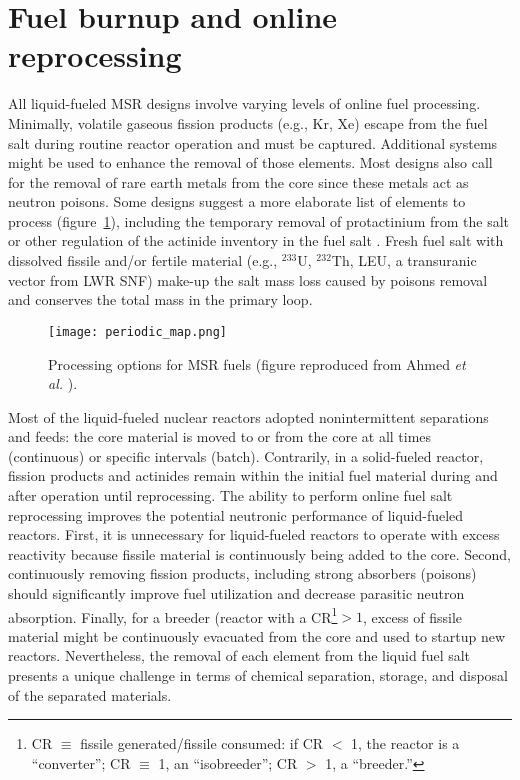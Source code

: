 \section{Fuel burnup and online reprocessing}
All liquid-fueled \gls{MSR} designs involve varying levels of online fuel 
processing. Minimally, volatile gaseous fission products (e.g., Kr, Xe) 
escape from the fuel salt during routine reactor operation and must be 
captured. Additional systems might be used to enhance the removal of those 
elements. Most designs also call for the removal of rare earth metals from 
the core since these metals act as neutron poisons. Some designs suggest a 
more elaborate list of elements to process (figure~\ref{fig:periodic_tab}), 
including the temporary removal of protactinium from the salt or other 
regulation of the actinide inventory in the fuel salt 
\cite{ahmad_neutronics_2015}. Fresh fuel salt with dissolved fissile and/or 
fertile material (e.g., $^{233}$U, $^{232}$Th, \gls{LEU}, a transuranic 
vector from \gls{LWR} \gls{SNF}) make-up the salt mass loss caused by poisons 
removal and conserves the total mass in the primary loop.
\begin{figure}[htp!] %
  \centering
  \texttt{[image: periodic\_map.png]}
  \caption{Processing options for \gls{MSR} fuels (figure reproduced from 
  Ahmed \emph{et al.} \cite{ahmad_neutronics_2015}).}
  \label{fig:periodic_tab}
\end{figure}

Most of the liquid-fueled nuclear reactors adopted nonintermittent 
separations and feeds: the core material is moved to or from the core at all 
times (continuous) or specific intervals (batch). Contrarily, in a 
solid-fueled reactor, fission products and actinides 
remain within the initial fuel material during and after operation until 
reprocessing. The ability to perform online fuel salt reprocessing improves 
the potential neutronic performance of liquid-fueled reactors. First, it 
is unnecessary for liquid-fueled reactors to operate with excess reactivity 
because fissile material is continuously being added to the core. Second, 
continuously removing fission products, including strong absorbers (poisons) 
should significantly improve fuel utilization and decrease parasitic 
neutron absorption. Finally, for a breeder (reactor with a 
\gls{CR}\footnote{\gls{CR} $\equiv$ fissile generated/fissile consumed: if CR 
$<$ 1, the reactor is a ``converter''; CR $\equiv$ 1, an ``isobreeder''; 
CR $>$ 1, a ``breeder.''}$>1$, excess of fissile material might be 
continuously evacuated from the core and used to startup new reactors. 
Nevertheless, the removal of each element from the liquid fuel salt presents 
a unique challenge in terms of chemical separation, storage, and disposal of 
the separated materials.


